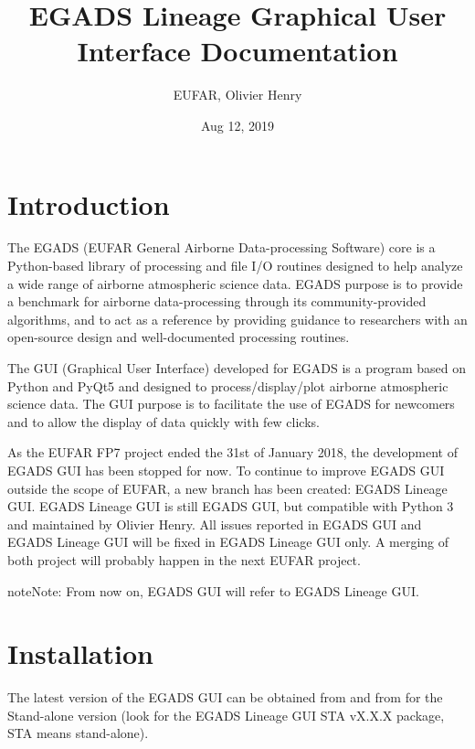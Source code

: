 \documentclass[a4paper,10pt,openany,english]{sphinxmanual}
\title{EGADS Lineage Graphical User Interface Documentation}
\date{Aug 12, 2019}
\author{EUFAR, Olivier Henry}
\begin{document}
\maketitle
\sphinxtableofcontents
{}\label{\detokenize{index::doc}}



\chapter{Introduction}
\label{\detokenize{intro:introduction}}\label{\detokenize{intro::doc}}
The EGADS (EUFAR General Airborne Data-processing Software) core is a Python-based library of processing and file I/O routines designed to help analyze a wide range of airborne atmospheric science data. EGADS purpose is to provide a benchmark for airborne data-processing through its community-provided algorithms, and to act as a reference by providing guidance to researchers with an open-source design and well-documented processing routines.

The GUI (Graphical User Interface) developed for EGADS is a program based on Python and PyQt5 and designed to process/display/plot airborne atmospheric science data. The GUI purpose is to facilitate the use of EGADS for newcomers and to allow the display of data quickly with few clicks.

As the EUFAR FP7 project ended the 31st of January 2018, the development of EGADS GUI has been stopped for now. To continue to improve EGADS GUI outside the scope of EUFAR, a new branch has been created: EGADS Lineage GUI. EGADS Lineage GUI is still EGADS GUI, but compatible with Python 3 and maintained by Olivier Henry. All issues reported in EGADS GUI and EGADS Lineage GUI will be fixed in EGADS Lineage GUI only. A merging of both project will probably happen in the next EUFAR project.

\begin{sphinxadmonition}{note}{Note:}
From now on, EGADS GUI will refer to EGADS Lineage GUI.
\end{sphinxadmonition}


\chapter{Installation}
\label{\detokenize{install:installation}}\label{\detokenize{install::doc}}
The latest version of the EGADS GUI can be obtained from  and from  for the Stand-alone version (look for the EGADS Lineage GUI STA vX.X.X package, STA means stand-alone).
\end{document}
